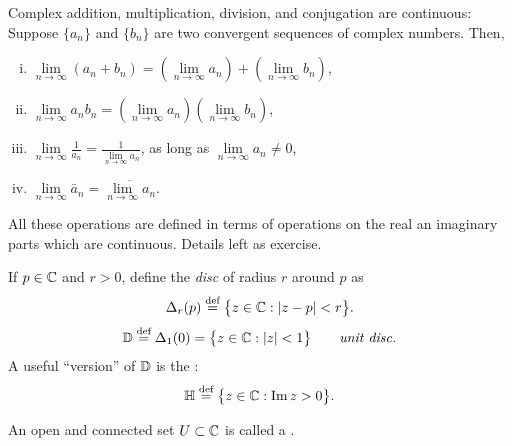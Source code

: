 \documentclass[10pt,aspectratio=169]{beamer}
\begin{document}
\begin{frame}

\begin{proposition}
Complex addition, multiplication, division, and conjugation are continuous:
Suppose $\{ a_n \}$ and $\{ b_n \}$ are two convergent sequences
of complex numbers.  Then,
\begin{enumerate}[(i)]
\item
$\lim\limits_{n\to\infty} (a_n + b_n) = 
\left(\lim\limits_{n\to\infty} a_n \right) +
\left(\lim\limits_{n\to\infty} b_n \right)$,
\item
$\lim\limits_{n\to\infty} a_n b_n = 
\left(\lim\limits_{n\to\infty} a_n \right)
\left(\lim\limits_{n\to\infty} b_n \right)$,
\item
$\lim\limits_{n\to\infty} \frac{1}{a_n} = \frac{1}{\lim\limits_{n\to\infty} a_n}$,
as long as $\lim\limits_{n\to\infty} a_n \not= 0$,
\item
$\lim\limits_{n\to\infty} \bar{a}_n = 
\overline{\lim\limits_{n\to\infty} a_n}$.
\end{enumerate}
\end{proposition}

\medskip
\pause

All these operations are defined in terms of operations on the real an
imaginary parts which are continuous.  Details left as exercise.

\end{frame}

\begin{frame}

If $p \in {\mathbb{C}}$ and $r > 0$, define the \emph{disc} of radius $r$ around $p$
as
\begin{equation*}
\Delta_r(p)
\overset{\text{def}}{=}
\bigl\{ z \in {\mathbb{C}} : \lvert {z-p} \rvert < r \bigr\} .
\end{equation*}
\pause
\begin{equation*}
{\mathbb{D}}
\overset{\text{def}}{=}
\Delta_1(0)
=
\bigl\{ z \in {\mathbb{C}} : \lvert {z} \rvert < 1 \bigr\} 
\qquad \text{\emph{unit disc}}.
\end{equation*}
\pause
A useful ``version'' of ${\mathbb{D}}$ is the \emph{}:
\begin{equation*}
{\mathbb{H}} 
\overset{\text{def}}{=}
\bigl\{
z \in {\mathbb{C}} : \operatorname{Im} z > 0
\bigr\} .
\end{equation*}

\medskip
\pause

\begin{definition}
An open and connected set $U \subset {\mathbb{C}}$ is called a
\emph{}.
\end{definition}

\end{frame}
\end{document}
